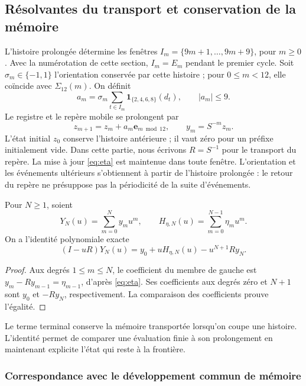\subsection{Résolvantes du transport et conservation de la mémoire}
\label{subsec:ii-memoria-resolvente}

L’histoire prolongée détermine les fenêtres
\(I_m=\{9m+1,\ldots,9m+9\}\), pour \(m\geq0\).
Avec la numérotation de cette section, \(I_m=E_m\) pendant le premier cycle.
Soit \(\sigma_m\in\{-1,1\}\) l’orientation conservée par cette histoire ;
pour \(0\leq m<12\), elle coïncide avec \(\Sigma_{12}(m)\). On définit
\[
 a_m=\sigma_m\sum_{t\in I_m}\mathbf1_{\{2,4,6,8\}}(d_t),
 \qquad |a_m|\leq9.
\]
Le registre et le repère mobile se prolongent par
\[
 z_{m+1}=z_m+a_m\mathbf e_{m\bmod12},\qquad y_m=S^{-m}z_m.
\]
L’état initial \(z_0\) conserve l’histoire antérieure ; il vaut zéro pour
un préfixe initialement vide. Dans cette partie, nous écrivons
\(R=S^{-1}\) pour le transport du repère. La mise à jour
\eqref{eq:eta} est maintenue dans toute fenêtre. L’orientation et les événements
ultérieurs s’obtiennent à partir de l’histoire prolongée : le retour du repère
ne présuppose pas la périodicité de la suite d’événements.

\begin{proposition}
Pour $N\geq1$, soient
\[
Y_N(u)=\sum_{m=0}^N y_mu^m,\qquad
H_{\eta,N}(u)=\sum_{m=0}^{N-1}\eta_mu^m.
\]
On a l’identité polynomiale exacte
\begin{equation}
(I-uR)Y_N(u)=y_0+uH_{\eta,N}(u)-u^{N+1}Ry_N.
\label{mem:identidad-finita}
\end{equation}
\end{proposition}
\begin{proof}
Aux degrés $1\leq m\leq N$, le coefficient du membre de gauche est
$y_m-Ry_{m-1}=\eta_{m-1}$, d’après \eqref{eq:eta}.
Ses coefficients aux degrés zéro et $N+1$ sont $y_0$ et $-Ry_N$,
respectivement. La comparaison des coefficients prouve l’égalité.
\end{proof}

Le terme terminal conserve la mémoire transportée lorsqu’on coupe une histoire.
L’identité permet de comparer une évaluation finie à son prolongement
en maintenant explicite l’état qui reste à la frontière.


\subsubsection{Correspondance avec le développement commun de mémoire}

